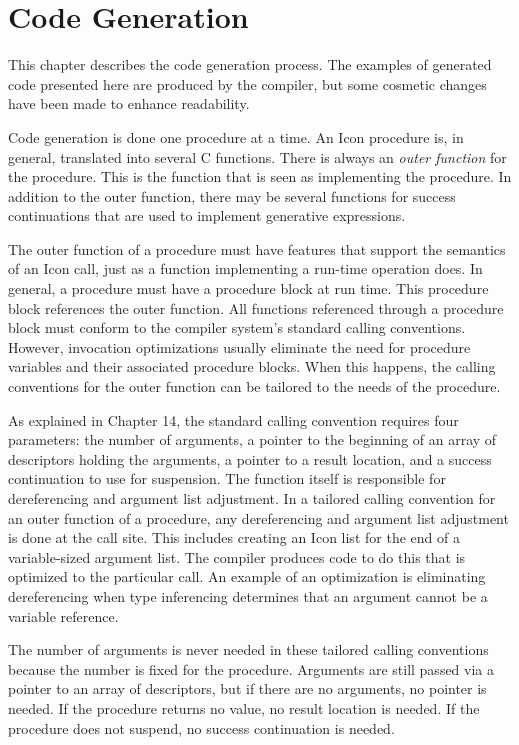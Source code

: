 \chapter{Code Generation}

This chapter describes the code generation process. The examples of
generated code presented here are produced by the compiler, but some
cosmetic changes have been made to enhance readability.

Code generation is done one procedure at a time. An Icon procedure is,
in general, translated into several C functions. There is always an
\textit{outer function}
for the procedure. This is the function that is seen as implementing
the procedure. In addition to the outer function, there may be several
functions for success continuations that are used to implement
generative expressions.

The outer function of a procedure must have features that support the
semantics of an Icon call, just as a function implementing a run-time
operation does. In general, a procedure must have a procedure block at
run time. This procedure block references the outer function. All
functions referenced through a procedure block must conform to the
compiler system's standard calling conventions. However, invocation
optimizations usually eliminate the need for procedure variables and
their associated procedure blocks. When this happens, the calling
conventions for the outer function can be tailored to the needs of the
procedure.

As explained in Chapter 14, the standard calling convention requires
four parameters: the number of arguments, a pointer to the beginning
of an array of descriptors holding the arguments, a pointer to a
result location, and a success continuation to use for suspension. The
function itself is responsible for dereferencing and argument list
adjustment.  In a tailored calling convention for an outer function of
a procedure, any dereferencing and argument list adjustment is done at
the call site. This includes creating an Icon list for the end of a
variable-sized argument list. The compiler produces code to do this
that is optimized to the particular call. An example of an
optimization is eliminating dereferencing when type inferencing
determines that an argument cannot be a variable reference.

The number of arguments is never needed in these tailored calling
conventions because the number is fixed for the procedure. Arguments
are still passed via a pointer to an array of descriptors, but if
there are no arguments, no pointer is needed. If the procedure returns
no value, no result location is needed. If the procedure does not
suspend, no success continuation is needed.

